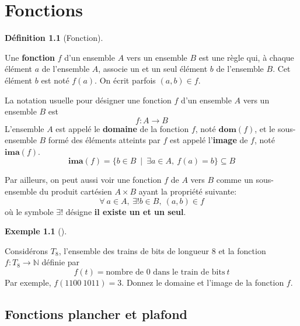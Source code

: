 \documentclass[
  letterpaper,
]{scrbook}
\newcommand{\set}[1]{\{#1\}}
\theoremstyle{plain}
\theoremstyle{definition}
\newtheorem{definition}{Définition}[chapter]
\theoremstyle{definition}
\newtheorem{example}{Exemple}[chapter]
\theoremstyle{remark}
\begin{document}

\hypertarget{fonctions}{%
\chapter{Fonctions}\label{fonctions}}

\begin{definition}[Fonction]\protect\hypertarget{def-fonction}{}\label{def-fonction}

Une \textbf{fonction} \(f\) d'un ensemble \(A\) vers un ensemble \(B\)
est une règle qui, à chaque élément \(a\) de l'ensemble \(A\), associe
un et un seul élément \(b\) de l'ensemble \(B\). Cet élément \(b\) est
noté \(f(a)\). On écrit parfois \((a,b)\in f\).

La notation usuelle pour désigner une fonction \(f\) d'un ensemble \(A\)
vers un ensemble \(B\) est \[
f:A\rightarrow B
\] L'ensemble \(A\) est appelé le \textbf{domaine} de la fonction \(f\),
noté \(\mathbf{dom} (f)\), et le sous-ensemble \(B\) formé des éléments
atteints par \(f\) est appelé l'\textbf{image} de \(f\), noté
\(\mathbf{ima} (f)\). \[
\mathbf{ima} (f) = \set{b\in B\ \mid\ \exists a\in A,\ f(a)=b} \subseteq B
\]

\end{definition}

Par ailleurs, on peut aussi voir une fonction \(f\) de \(A\) vers \(B\)
comme un sous-ensemble du produit cartésien \(A\times B\) ayant la
propriété suivante: \[
\forall\ a\in A,\ \exists !b\in B,\ (a,b)\in f
\] où le symbole \(\exists !\) désigne \textbf{il existe un et un seul}.

\begin{example}[]\protect\hypertarget{exm-fonction-trains-bits-longueur-8}{}\label{exm-fonction-trains-bits-longueur-8}

Considérons \(T_8\), l'ensemble des trains de bits de longueur 8 et la
fonction \(f:T_8\rightarrow \mathbb{N}\) définie par \[
f(t)=\text{nombre de 0 dans le train de bits}\ t
\] Par exemple, \(f(1100\ 1011)=3\). Donnez le domaine et l'image de la
fonction \(f\).

\end{example}

\hypertarget{fonctions-plancher-et-plafond}{%
\section{Fonctions plancher et
plafond}\label{fonctions-plancher-et-plafond}}
\end{document}
